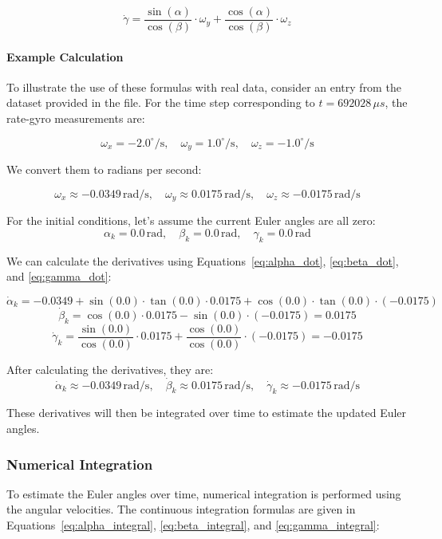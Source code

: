 \documentclass[12pt]{article}
\begin{document}
\begin{equation}
\label{eq:gamma_dot}
\dot{\gamma} = \frac{\sin(\alpha)}{\cos(\beta)} \cdot \omega_y + \frac{\cos(\alpha)}{\cos(\beta)} \cdot \omega_z
\end{equation}

\paragraph{Example Calculation}
To illustrate the use of these formulas with real data, consider an entry from the dataset provided in the file. For the time step corresponding to \( t = 692028 \, \mu s \), the rate-gyro measurements are:

\begin{equation}
\label{eq:rate-gyro}
\omega_x = -2.0^\circ/\text{s}, \quad \omega_y = 1.0^\circ/\text{s}, \quad \omega_z = -1.0^\circ/\text{s}
\end{equation}

We convert them to radians per second:

\begin{equation}
\label{eq:rate-gyro-rad}
\omega_x \approx -0.0349 \, \text{rad/s}, \quad \omega_y \approx 0.0175 \, \text{rad/s}, \quad \omega_z \approx -0.0175 \, \text{rad/s}
\end{equation}

For the initial conditions, let's assume the current Euler angles are all zero:
\[
\alpha_k = 0.0 \, \text{rad}, \quad \beta_k = 0.0 \, \text{rad}, \quad \gamma_k = 0.0 \, \text{rad}
\]

We can calculate the derivatives using Equations~\eqref{eq:alpha_dot}, \eqref{eq:beta_dot}, and \eqref{eq:gamma_dot}:

\[
\dot{\alpha}_k = -0.0349 + \sin(0.0) \cdot \tan(0.0) \cdot 0.0175 + \cos(0.0) \cdot \tan(0.0) \cdot (-0.0175)
\]
\[
\dot{\beta}_k = \cos(0.0) \cdot 0.0175 - \sin(0.0) \cdot (-0.0175) = 0.0175
\]
\[
\dot{\gamma}_k = \frac{\sin(0.0)}{\cos(0.0)} \cdot 0.0175 + \frac{\cos(0.0)}{\cos(0.0)} \cdot (-0.0175) = -0.0175
\]

After calculating the derivatives, they are:
\[
\dot{\alpha}_k \approx -0.0349 \, \text{rad/s}, \quad \dot{\beta}_k \approx 0.0175 \, \text{rad/s}, \quad \dot{\gamma}_k \approx -0.0175 \, \text{rad/s}
\]

These derivatives will then be integrated over time to estimate the updated Euler angles.

\subsubsection{Numerical Integration}
To estimate the Euler angles over time, numerical integration is performed using the angular velocities. The continuous integration formulas are given in Equations~\eqref{eq:alpha_integral}, \eqref{eq:beta_integral}, and \eqref{eq:gamma_integral}:
\end{document}

